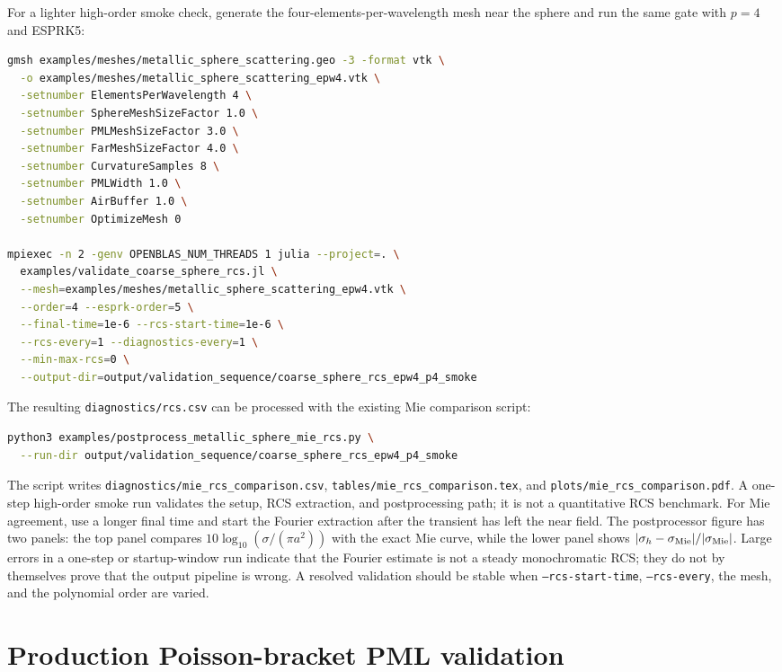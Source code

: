 \documentclass[11pt,oneside]{book}
\newcommand{\code}[1]{\texttt{#1}}
\begin{document}
For a lighter high-order smoke check, generate the four-elements-per-wavelength
mesh near the sphere and run the same gate with $p=4$ and ESPRK5:
\begin{lstlisting}[language=bash]
gmsh examples/meshes/metallic_sphere_scattering.geo -3 -format vtk \
  -o examples/meshes/metallic_sphere_scattering_epw4.vtk \
  -setnumber ElementsPerWavelength 4 \
  -setnumber SphereMeshSizeFactor 1.0 \
  -setnumber PMLMeshSizeFactor 3.0 \
  -setnumber FarMeshSizeFactor 4.0 \
  -setnumber CurvatureSamples 8 \
  -setnumber PMLWidth 1.0 \
  -setnumber AirBuffer 1.0 \
  -setnumber OptimizeMesh 0

mpiexec -n 2 -genv OPENBLAS_NUM_THREADS 1 julia --project=. \
  examples/validate_coarse_sphere_rcs.jl \
  --mesh=examples/meshes/metallic_sphere_scattering_epw4.vtk \
  --order=4 --esprk-order=5 \
  --final-time=1e-6 --rcs-start-time=1e-6 \
  --rcs-every=1 --diagnostics-every=1 \
  --min-max-rcs=0 \
  --output-dir=output/validation_sequence/coarse_sphere_rcs_epw4_p4_smoke
\end{lstlisting}
The resulting \code{diagnostics/rcs.csv} can be processed with the existing Mie
comparison script:
\begin{lstlisting}[language=bash]
python3 examples/postprocess_metallic_sphere_mie_rcs.py \
  --run-dir output/validation_sequence/coarse_sphere_rcs_epw4_p4_smoke
\end{lstlisting}
The script writes \code{diagnostics/mie\_rcs\_comparison.csv},
\code{tables/mie\_rcs\_comparison.tex}, and
\code{plots/mie\_rcs\_comparison.pdf}. A one-step high-order smoke run
validates the setup, RCS extraction, and postprocessing path; it is not a
quantitative RCS benchmark. For Mie agreement, use a longer final time and
start the Fourier extraction after the transient has left the near field.
The postprocessor figure has two panels: the top panel compares
$10\log_{10}(\sigma/(\pi a^2))$ with the exact Mie curve, while the lower panel
shows $|\sigma_h-\sigma_{\rm Mie}|/|\sigma_{\rm Mie}|$. Large errors in a
one-step or startup-window run indicate that the Fourier estimate is not a
steady monochromatic RCS; they do not by themselves prove that the output
pipeline is wrong. A resolved validation should be stable when
\code{--rcs-start-time}, \code{--rcs-every}, the mesh, and the polynomial order
are varied.

\section{Production Poisson-bracket PML validation}
\end{document}
